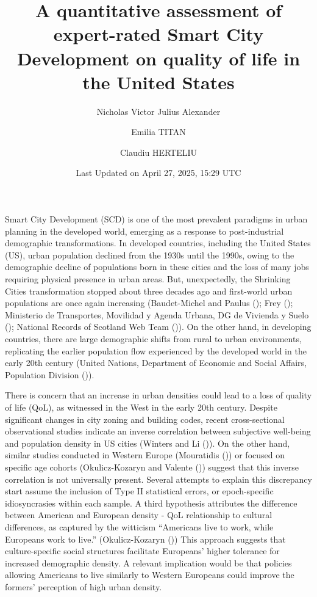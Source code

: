 \documentclass[
  english,
  12pt,
  a4paper,
]{scrartcl}
\title{A quantitative assessment of expert-rated Smart City Development
on quality of life in the United States}
\author[1]{Nicholas Victor Julius Alexander}
\author[1]{Emilia TITAN}
\author[1]{Claudiu HERTELIU}
\affil[1]{Department of Statistics and Econometrics, Bucharest
University for Economic Studies}
\date{Last Updated on April 27, 2025, 15:29 UTC}
\begin{document}
\maketitle


Smart City Development (SCD) is one of the most prevalent paradigms in
urban planning in the developed world, emerging as a response to
post-industrial demographic transformations. In developed countries,
including the United States (US), urban population declined from the
1930s until the 1990s, owing to the demographic decline of populations
born in these cities and the loss of many jobs requiring physical
presence in urban areas. But, unexpectedly, the Shrinking Cities
transformation stopped about three decades ago and first-world urban
populations are once again increasing (Baudet-Michel and Paulus
();
Frey (); Ministerio de
Transportes, Movilidad y Agenda Urbana, DG de Vivienda y Suelo
();
National Records of Scotland Web Team
()).
On the other hand, in developing countries, there are large demographic
shifts from rural to urban environments, replicating the earlier
population flow experienced by the developed world in the early 20th
century (United Nations, Department of Economic and Social Affairs,
Population Division
()).

There is concern that an increase in urban densities could lead to a
loss of quality of life (QoL), as witnessed in the West in the early
20th century. Despite significant changes in city zoning and building
codes, recent cross-sectional observational studies indicate an inverse
correlation between subjective well-being and population density in US
cities (Winters and Li
()). On the
other hand, similar studies conducted in Western Europe (Mouratidis
()) or focused on
specific age cohorts (Okulicz-Kozaryn and Valente
()) suggest that
this inverse correlation is not universally present. Several attempts to
explain this discrepancy start assume the inclusion of Type II
statistical errors, or epoch-specific idiosyncrasies within each sample.
A third hypothesis attributes the difference between American and
European density - QoL relationship to cultural differences, as captured
by the witticism ``Americans live to work, while Europeans work to
live.'' (Okulicz-Kozaryn
()) This
approach suggests that culture-specific social structures facilitate
Europeans' higher tolerance for increased demographic density. A
relevant implication would be that policies allowing Americans to live
similarly to Western Europeans could improve the formers' perception of
high urban density.
\end{document}
